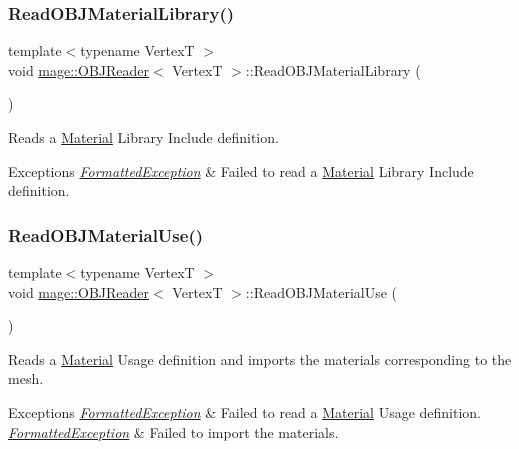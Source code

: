 \subsubsection{\texorpdfstring{Read\+O\+B\+J\+Material\+Library()}{ReadOBJMaterialLibrary()}}
{\footnotesize\ttfamily template$<$typename VertexT $>$ \\
void \hyperlink{classmage_1_1_o_b_j_reader}{mage\+::\+O\+B\+J\+Reader}$<$ VertexT $>$\+::Read\+O\+B\+J\+Material\+Library (\begin{DoxyParamCaption}{ }\end{DoxyParamCaption})\hspace{0.3cm}{\ttfamily [private]}}

Reads a \hyperlink{structmage_1_1_material}{Material} Library Include definition.


\begin{DoxyExceptions}{Exceptions}
{\em \hyperlink{structmage_1_1_formatted_exception}{Formatted\+Exception}} & Failed to read a \hyperlink{structmage_1_1_material}{Material} Library Include definition. \\
\hline
\end{DoxyExceptions}
\hypertarget{classmage_1_1_o_b_j_reader_aa4c73ff0e5e3de40cacbebc189037802}{}\label{classmage_1_1_o_b_j_reader_aa4c73ff0e5e3de40cacbebc189037802} 
\subsubsection{\texorpdfstring{Read\+O\+B\+J\+Material\+Use()}{ReadOBJMaterialUse()}}
{\footnotesize\ttfamily template$<$typename VertexT $>$ \\
void \hyperlink{classmage_1_1_o_b_j_reader}{mage\+::\+O\+B\+J\+Reader}$<$ VertexT $>$\+::Read\+O\+B\+J\+Material\+Use (\begin{DoxyParamCaption}{ }\end{DoxyParamCaption})\hspace{0.3cm}{\ttfamily [private]}}

Reads a \hyperlink{structmage_1_1_material}{Material} Usage definition and imports the materials corresponding to the mesh.


\begin{DoxyExceptions}{Exceptions}
{\em \hyperlink{structmage_1_1_formatted_exception}{Formatted\+Exception}} & Failed to read a \hyperlink{structmage_1_1_material}{Material} Usage definition. \\
\hline
{\em \hyperlink{structmage_1_1_formatted_exception}{Formatted\+Exception}} & Failed to import the materials. \\
\hline
\end{DoxyExceptions}
\hypertarget{classmage_1_1_o_b_j_reader_afc3f17024a006cce3b7869ca8c6a8f07}{}\label{classmage_1_1_o_b_j_reader_afc3f17024a006cce3b7869ca8c6a8f07} 
